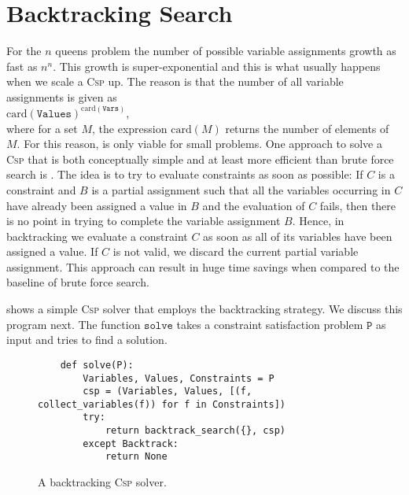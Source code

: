 \section{Backtracking Search}
For the $n$ queens problem the number of possible variable assignments growth as fast as $n^n$.
This growth is super-exponential and this is what usually happens when we scale a \textsc{Csp} up. 
The reason is that the number of all variable assignments is given as
\\[0.2cm]
\hspace*{1.3cm}
$\mathrm{card}(\texttt{Values})^{\mathrm{card}(\texttt{Vars})}$,
\\[0.2cm]
where for a set $M$, the expression $\mathrm{card}(M)$ returns the number of elements of $M$.
For this reason,  is only viable for small problems.  One approach to solve a \textsc{Csp}
that is both conceptually simple and at least more efficient than brute force search is .  The idea
is to try to evaluate constraints as soon as possible:  If $C$ is a constraint and $B$ is a partial assignment
such that all the variables occurring in $C$ have already been assigned a value in $B$ and the evaluation of $C$
fails, then there is no point in trying to complete the variable assignment $B$.  Hence, in backtracking we
evaluate a constraint $C$ as soon as all of its variables have been assigned a value.  If $C$ is not valid, we
discard the current partial variable assignment.  This approach can result in huge time savings
when compared to the baseline of brute force search.

 shows a simple \textsc{Csp} solver 
that employs the backtracking strategy.  
We discuss this program next.  The function $\texttt{solve}$ takes a constraint
satisfaction problem $\texttt{P}$ as input and tries to find a solution.  


\begin{figure}[!ht]
\centering
\begin{verbatim}
    def solve(P):
        Variables, Values, Constraints = P
        csp = (Variables, Values, [(f, collect_variables(f)) for f in Constraints])
        try:
            return backtrack_search({}, csp)
        except Backtrack:
            return None
\end{verbatim}
\vspace*{-0.3cm}
\caption{A backtracking \textsc{Csp} solver.}
\label{fig:Backtrack-Solver.ipynb}
\end{figure}

